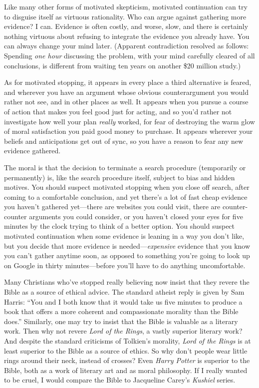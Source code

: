 {
 Like many other forms of motivated skepticism, motivated
continuation can try to disguise itself as virtuous rationality. Who
can argue against gathering more evidence? I can. Evidence is often
costly, and worse, slow, and there is certainly nothing virtuous about
refusing to integrate the evidence you already have. You can always
change your mind later. (Apparent contradiction resolved as follows:
Spending \textit{one hour} discussing the problem, with your mind
carefully cleared of all conclusions, is different from waiting ten
years on another \$20 million study.)}

{
 As for motivated stopping, it appears in every place a third
alternative is feared, and wherever you have an argument whose obvious
counterargument you would rather not see, and in other places as well.
It appears when you pursue a course of action that makes you feel good
just for acting, and so you'd rather not investigate
how well your plan \textit{really} worked, for fear of destroying the
warm glow of moral satisfaction you paid good money to purchase. It
appears wherever your beliefs and anticipations get out of sync, so you
have a reason to fear any new evidence gathered.}

{
 The moral is that the decision to terminate a search procedure
(temporarily or permanently) is, like the search procedure itself,
subject to bias and hidden motives. You should suspect motivated
stopping when you close off search, after coming to a comfortable
conclusion, and yet there's a lot of fast cheap
evidence you haven't gathered yet---there are websites
you could visit, there are counter-counter arguments you could
consider, or you haven't closed your eyes for five
minutes by the clock trying to think of a better option. You should
suspect motivated continuation when some evidence is leaning in a way
you don't like, but you decide that more evidence is
needed---\textit{expensive} evidence that you know you
can't gather anytime soon, as opposed to something
you're going to look up on Google in thirty
minutes---before you'll have to do anything
uncomfortable.}

\myendsectiontext


{
 Many Christians who've stopped really believing
now insist that they revere the Bible as a source of ethical advice.
The standard atheist reply is given by Sam Harris:
``You and I both know that it would take us five
minutes to produce a book that offers a more coherent and compassionate
morality than the Bible does.'' Similarly, one may
try to insist that the Bible is valuable as a literary work. Then why
not revere \textit{Lord of the Rings}, a vastly superior literary work?
And despite the standard criticisms of Tolkien's
morality, \textit{Lord of the Rings} is at least superior to the Bible
as a source of ethics. So why don't people wear little
rings around their neck, instead of crosses? Even \textit{Harry Potter}
is superior to the Bible, both as a work of literary art and as moral
philosophy. If I really wanted to be cruel, I would compare the Bible
to Jacqueline Carey's \textit{Kushiel} series. }

